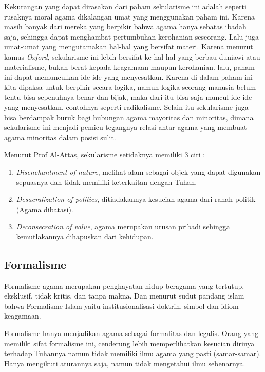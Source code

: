 \documentclass[
  12pt,
]{article}
\begin{document}
    Kekurangan yang dapat dirasakan dari paham sekularisme ini adalah seperti rusaknya moral agama dikalangan umat yang menggunakan paham ini. Karena masih banyak dari mereka yang berpikir bahwa agama hanya sebatas ibadah saja, sehingga dapat menghambat pertumbuhan kerohanian seseorang. Lalu juga umat-umat yang mengutamakan hal-hal yang bersifat materi. Karena menurut kamus \emph{Oxford}, sekularisme ini lebih bersifat ke hal-hal yang berbau duniawi atau materialisme, bukan berat kepada keagamaan maupun kerohanian. lalu, paham ini dapat memunculkan ide ide yang menyesatkan. Karena di dalam paham ini kita dipaksa untuk berpikir secara logika, namun logika seorang manusia belum tentu bisa sepenuhnya benar dan bijak, maka dari itu bisa saja muncul ide-ide yang menyesatkan, contohnya seperti radikalisme.  Selain itu sekularisme juga bisa berdampak buruk bagi hubungan agama mayoritas dan minoritas, dimana sekularisme ini menjadi pemicu tegangnya relasi antar agama yang membuat agama minoritas dalam posisi sulit.
      
    Menurut Prof Al-Attas, sekularisme setidaknya memiliki 3 ciri : 
    \begin{enumerate}
      \item \emph{Disenchantment of nature}, melihat alam sebagai objek yang dapat digunakan sepuasnya dan tidak memiliki keterkaitan dengan Tuhan. 
      \item \emph{Desacralization of politics}, ditiadakannya kesucian agama dari ranah politik (Agama dibatasi).
      \item \emph{Deconsecration of value}, agama merupakan urusan pribadi sehingga kemutlakannya dihapuskan dari kehidupan.
    \end{enumerate}

    \subsection{Formalisme}
    Formalisme agama merupakan penghayatan hidup beragama yang tertutup, eksklusif, tidak kritis, dan tanpa makna. Dan menurut sudut pandang islam bahwa Formalisme Islam yaitu institusionalisasi doktrin, simbol dan idiom keagamaan.
      
    Formalisme hanya menjadikan agama sebagai formalitas dan legalis. Orang yang memiliki sifat formalisme ini, cenderung lebih memperlihatkan kesucian dirinya terhadap  Tuhannya namun tidak memiliki ilmu agama yang pasti (samar-samar). Hanya mengikuti aturannya saja, namun tidak mengetahui ilmu sebenarnya. 
      
\end{document}
